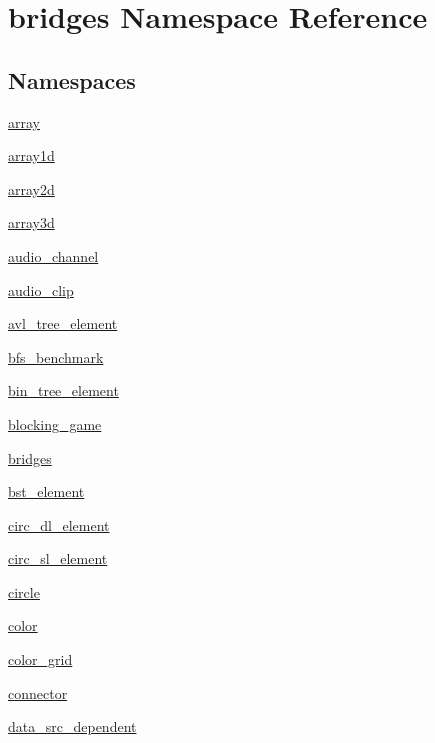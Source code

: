 \hypertarget{namespacebridges}{}\section{bridges Namespace Reference}
\label{namespacebridges}
\subsection*{Namespaces}
\begin{DoxyCompactItemize}
\item 
 \hyperlink{namespacebridges_1_1array}{array}
\item 
 \hyperlink{namespacebridges_1_1array1d}{array1d}
\item 
 \hyperlink{namespacebridges_1_1array2d}{array2d}
\item 
 \hyperlink{namespacebridges_1_1array3d}{array3d}
\item 
 \hyperlink{namespacebridges_1_1audio__channel}{audio\+\_\+channel}
\item 
 \hyperlink{namespacebridges_1_1audio__clip}{audio\+\_\+clip}
\item 
 \hyperlink{namespacebridges_1_1avl__tree__element}{avl\+\_\+tree\+\_\+element}
\item 
 \hyperlink{namespacebridges_1_1bfs__benchmark}{bfs\+\_\+benchmark}
\item 
 \hyperlink{namespacebridges_1_1bin__tree__element}{bin\+\_\+tree\+\_\+element}
\item 
 \hyperlink{namespacebridges_1_1blocking__game}{blocking\+\_\+game}
\item 
 \hyperlink{namespacebridges_1_1bridges}{bridges}
\item 
 \hyperlink{namespacebridges_1_1bst__element}{bst\+\_\+element}
\item 
 \hyperlink{namespacebridges_1_1circ__dl__element}{circ\+\_\+dl\+\_\+element}
\item 
 \hyperlink{namespacebridges_1_1circ__sl__element}{circ\+\_\+sl\+\_\+element}
\item 
 \hyperlink{namespacebridges_1_1circle}{circle}
\item 
 \hyperlink{namespacebridges_1_1color}{color}
\item 
 \hyperlink{namespacebridges_1_1color__grid}{color\+\_\+grid}
\item 
 \hyperlink{namespacebridges_1_1connector}{connector}
\item 
 \hyperlink{namespacebridges_1_1data__src__dependent}{data\+\_\+src\+\_\+dependent}

\end{DoxyCompactItemize}
